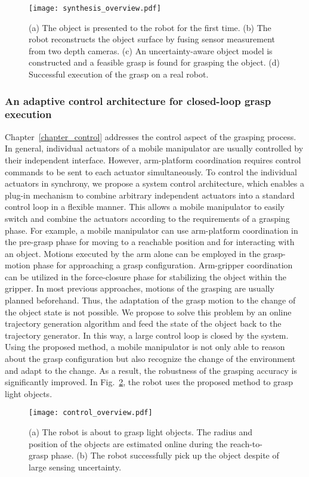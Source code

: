 \begin{figure}[!htbp]
\centering
\texttt{[image: synthesis\_overview.pdf]}
\captionsetup{justification=raggedright}
\caption{(a) The object is presented to the robot for the first time. (b) The robot reconstructs the object surface by fusing sensor measurement from two depth cameras. (c) An uncertainty-aware object model is constructed and a feasible grasp is found for grasping the object. (d) Successful execution of the grasp on a real robot.}
\label{fig:synthesis_overview}
\end{figure} 
\subsubsection{An adaptive control architecture for closed-loop grasp execution}
Chapter~\ref{chapter_control} addresses the control aspect of the grasping process. In general, individual actuators of a mobile manipulator are usually controlled by their independent interface. However, arm-platform coordination requires control commands to be sent to each actuator simultaneously. To control the individual actuators in synchrony, we propose a system control architecture, which enables a plug-in mechanism to combine arbitrary independent actuators into a standard control loop in a flexible manner. This allows a mobile manipulator to easily switch and combine the actuators according to the requirements of a grasping phase. For example, a mobile manipulator can use arm-platform coordination in the pre-grasp phase for moving to a reachable position and for interacting with an object. Motions executed by the arm alone can be employed in the grasp-motion phase for approaching a grasp configuration. Arm-gripper coordination can be utilized in the force-closure phase for  stabilizing the object within the gripper. In most previous approaches, motions of the grasping are usually planned beforehand. Thus, the adaptation of the grasp motion to the change of the object state is not possible. We propose to solve this problem by an online trajectory generation algorithm and feed the state of the object back to the trajectory generator. In this way, a large control loop is closed by the system. Using the proposed method, a mobile manipulator is not only able to reason about the grasp configuration but also recognize the change of the environment and adapt to the change. As a result, the robustness of the grasping accuracy is significantly improved. In Fig.~\ref{fig:control_overview}, the robot uses the proposed method to grasp light objects. 
\begin{figure}[!htbp]
\centering
\texttt{[image: control\_overview.pdf]}
\captionsetup{justification=raggedright}
\caption{(a) The robot is about to grasp light objects. The radius and position of the objects are estimated online during the reach-to-grasp phase. (b) The robot successfully pick up the object despite of large sensing uncertainty.}
\label{fig:control_overview}
\end{figure} 

